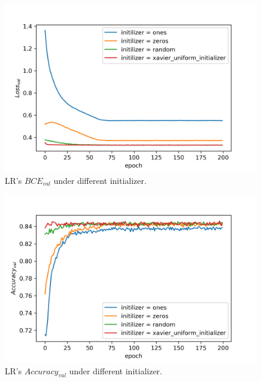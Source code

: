 \documentclass[journal, a4paper]{IEEEtran}
\begin{document}
\begin{figure}[!hbt]
	\begin{center}
		\includegraphics[width=\columnwidth]{lr_init_val_loss}
		\caption{LR's $BCE_{val}$ under different initializer.}
		\label{fig:lr_init_val_loss}
	\end{center}
\end{figure} \par

\begin{figure}[!hbt]
	\begin{center}
		\includegraphics[width=\columnwidth]{lr_init_val_acc}
		\caption{LR's $Accuracy_{val}$ under different initializer.}
		\label{fig:lr_init_val_acc}
	\end{center}
\end{figure} \par
\end{document}
